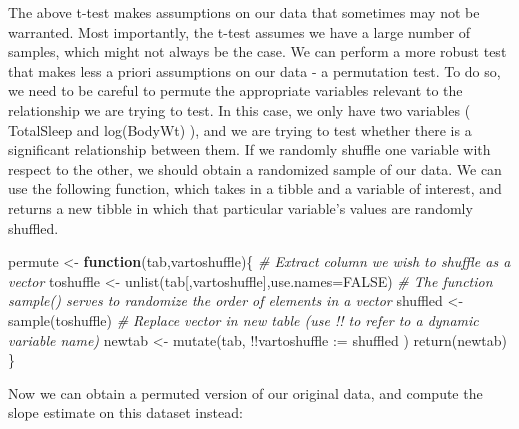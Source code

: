 \documentclass[
]{book}
\newenvironment{Shaded}{\begin{snugshade}}{\end{snugshade}}
\newcommand{\AttributeTok}[1]{\textcolor[rgb]{0.77,0.63,0.00}{#1}}
\newcommand{\CommentTok}[1]{\textcolor[rgb]{0.56,0.35,0.01}{\textit{#1}}}
\newcommand{\ConstantTok}[1]{\textcolor[rgb]{0.00,0.00,0.00}{#1}}
\newcommand{\ControlFlowTok}[1]{\textcolor[rgb]{0.13,0.29,0.53}{\textbf{#1}}}
\newcommand{\FunctionTok}[1]{\textcolor[rgb]{0.00,0.00,0.00}{#1}}
\newcommand{\NormalTok}[1]{#1}
\newcommand{\OtherTok}[1]{\textcolor[rgb]{0.56,0.35,0.01}{#1}}
\newcommand{\SpecialCharTok}[1]{\textcolor[rgb]{0.00,0.00,0.00}{#1}}
\newcommand{\StringTok}[1]{\textcolor[rgb]{0.31,0.60,0.02}{#1}}
\begin{document}
The above t-test makes assumptions on our data that sometimes may not be warranted. Most importantly, the t-test assumes we have a large number of samples, which might not always be the case. We can perform a more robust test that makes less a priori assumptions on our data - a permutation test. To do so, we need to be careful to permute the appropriate variables relevant to the relationship we are trying to test. In this case, we only have two variables ( TotalSleep and log(BodyWt) ), and we are trying to test whether there is a significant relationship between them. If we randomly shuffle one variable with respect to the other, we should obtain a randomized sample of our data. We can use the following function, which takes in a tibble and a variable of interest, and returns a new tibble in which that particular variable's values are randomly shuffled.

\begin{Shaded}
\begin{Highlighting}[]
\NormalTok{permute }\OtherTok{\textless{}{-}} \ControlFlowTok{function}\NormalTok{(tab,vartoshuffle)\{}
  \CommentTok{\# Extract column we wish to shuffle as a vector}
\NormalTok{  toshuffle }\OtherTok{\textless{}{-}} \FunctionTok{unlist}\NormalTok{(tab[,vartoshuffle],}\AttributeTok{use.names=}\ConstantTok{FALSE}\NormalTok{)}
  \CommentTok{\# The function sample() serves to randomize the order of elements in a vector}
\NormalTok{  shuffled }\OtherTok{\textless{}{-}} \FunctionTok{sample}\NormalTok{(toshuffle)}
  \CommentTok{\# Replace vector in new table (use !! to refer to a dynamic variable name)}
\NormalTok{  newtab }\OtherTok{\textless{}{-}} \FunctionTok{mutate}\NormalTok{(tab, }\SpecialCharTok{!!}\AttributeTok{vartoshuffle :=}\NormalTok{ shuffled )}
  \FunctionTok{return}\NormalTok{(newtab)}
\NormalTok{\}}
\end{Highlighting}
\end{Shaded}

Now we can obtain a permuted version of our original data, and compute the slope estimate on this dataset instead:

\begin{Shaded}
\end{Shaded}
\end{document}
